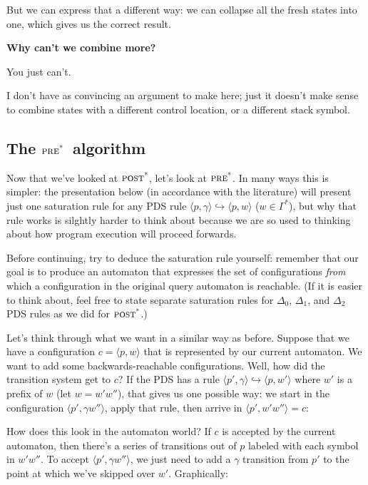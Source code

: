 \documentclass{article}
\newcommand{\Config}[2]{\ensuremath{\langle #1, #2 \rangle}}
\newcommand{\Rule}[2]{\ensuremath{#1 \hookrightarrow #2}}
\newcommand{\subsubsubsection}[1]{\textbf{#1}}
\newcommand{\poststar}{\ensuremath{\textsc{post}^\textsc{*}}}
\newcommand{\prestar}{\ensuremath{\textsc{pre}^\textsc{*}}}
\begin{document}
But we can express that a different way: we can collapse all the fresh
states into one, which gives us the correct result.

\subsubsubsection{Why can't we combine more?}

You just can't.

I don't have as convincing an argument to make here; just it doesn't
make sense to combine states with a different control location, or a
different stack symbol.


\subsection{The \prestar\ algorithm}

Now that we've looked at \poststar, let's look at \prestar. In many
ways this is simpler: the presentation below (in accordance with the
literature) will present just one saturation rule for any PDS rule
\Rule{\Config{p}{\gamma}}{\Config{p}{w}} ($w \in \Gamma^*$), but why
that rule works is silghtly harder to think about because we are so
used to thinking about how program execution will proceed forwards.

Before continuing, try to deduce the saturation rule yourself:
remember that our goal is to produce an automaton that expresses the
set of configurations \emph{from} which a configuration in the
original query automaton is reachable. (If it is easier to think
about, feel free to state separate saturation rules for $\Delta_0$,
$\Delta_1$, and $\Delta_2$ PDS rules as we did for \poststar.)

Let's think through what we want in a similar way as before. Suppose
that we have a configuration $c = \Config{p}{w}$ that is represented
by our current automaton. We want to add some backwards-reachable
configurations. Well, how did the transition system get to $c$? If the
PDS has a rule \Rule{\Config{p'}{\gamma}}{\Config{p}{w'}} where $w'$
is a prefix of $w$ (let $w = w'w''$), that gives us one possible way:
we start in the configuration \Config{p'}{\gamma w''}, apply that
rule, then arrive in $\Config{p'}{w'w''} = c$:

How does this look in the automaton world? If $c$ is accepted by the
current automaton, then there's a series of transitions out of $p$
labeled with each symbol in $w'w''$. To accept \Config{p'}{\gamma
  w''}, we just need to add a $\gamma$ transition from $p'$ to the
point at which we've skipped over $w'$. Graphically:
\end{document}
